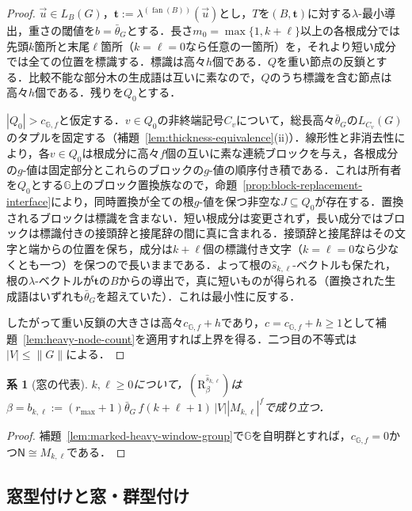 \documentclass[11pt,a4paper]{ltjsarticle}
\numberwithin{equation}{section}
\theoremstyle{plain}
\newtheorem{corollary}[theorem]{系}
\theoremstyle{definition}
\theoremstyle{remark}
\newcommand{\tuple}[1]{\vec{#1}}
\newcommand{\fan}{\operatorname{fan}}
\begin{document}
\begin{proof}
$\tuple u\in L_B(G)$，$\mathbf t:=\lambda^{(\fan(B))}(\tuple u)$とし，$T$を$(B,\mathbf t)$に対する$\lambda$-最小導出，重さの閾値を$b=\bar\theta_G$とする．長さ$m_0=\max\{1,k+\ell\}$以上の各根成分では先頭$k$箇所と末尾$\ell$箇所（$k=\ell=0$なら任意の一箇所）を，それより短い成分では全ての位置を標識する．標識は高々$h$個である．$Q$を重い節点の反鎖とする．比較不能な部分木の生成語は互いに素なので，$Q$のうち標識を含む節点は高々$h$個である．残りを$Q_0$とする．

$|Q_0|>c_{{\mathbb G},f}$と仮定する．$v\in Q_0$の非終端記号$C_v$について，総長高々$\bar\theta_G$の$L_{C_v}(G)$のタプルを固定する（補題~\ref{lem:thickness-equivalence}(ii)）．線形性と非消去性により，各$v\in Q_0$は根成分に高々$f$個の互いに素な連続ブロックを与え，各根成分の$g$-値は固定部分とこれらのブロックの$g$-値の順序付き積である．これは所有者を$Q_0$とする${\mathbb G}$上のブロック置換族なので，命題~\ref{prop:block-replacement-interface}により，同時置換が全ての根$g$-値を保つ非空な$J\subseteq Q_0$が存在する．置換されるブロックは標識を含まない．短い根成分は変更されず，長い成分ではブロックは標識付きの接頭辞と接尾辞の間に真に含まれる．接頭辞と接尾辞はその文字と端からの位置を保ち，成分は$k+\ell$個の標識付き文字（$k=\ell=0$なら少なくとも一つ）を保つので長いままである．よって根の$\widehat s_{k,\ell}$-ベクトルも保たれ，根の$\lambda$-ベクトルが$\mathbf t$の$B$からの導出で，真に短いものが得られる（置換された生成語はいずれも$\bar\theta_G$を超えていた）．これは最小性に反する．

したがって重い反鎖の大きさは高々$c_{{\mathbb G},f}+h$であり，$c=c_{{\mathbb G},f}+h\ge1$として補題~\ref{lem:heavy-node-count}を適用すれば上界を得る．二つ目の不等式は$|V|\le\|G\|$による．
\end{proof}

\begin{corollary}[窓の代表]
\label{lem:boundary-short-canonical}
$k,\ell\ge0$について，$(\mathrm R_\beta^{\widehat s_{k,\ell}})$は$\beta=b_{k,\ell}:=(r_{\max}+1)\bar\theta_G\,f(k+\ell+1)\,|V||M_{k,\ell}|^f$で成り立つ．
\end{corollary}

\begin{proof}
補題~\ref{lem:marked-heavy-window-group}で${\mathbb G}$を自明群とすれば，$c_{{\mathbb G},f}=0$かつ$\mathsf N\cong M_{k,\ell}$である．
\end{proof}

\subsection{窓型付けと窓・群型付け}
\label{subsec:boundary-polydata}
\end{document}
